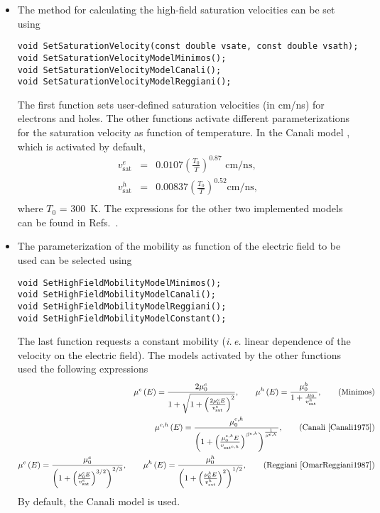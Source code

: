 \begin{itemize}
  \item
  The method for calculating the high-field saturation velocities 
  can be set using
\begin{lstlisting}
void SetSaturationVelocity(const double vsate, const double vsath);
void SetSaturationVelocityModelMinimos();
void SetSaturationVelocityModelCanali();
void SetSaturationVelocityModelReggiani();
\end{lstlisting}
  The first function sets user-defined saturation velocities (in cm/ns) for 
  electrons and holes. The other functions activate different parameterizations 
  for the saturation velocity as function of temperature. In the Canali model 
  \cite{Canali1975}, which is activated by default,
  \begin{eqnarray*}
    v_{\text{sat}}^{e} & = & 0.0107 \left(\frac{T_{0}}{T}\right)^{0.87} \text{ cm/ns}, \\ 
    v_{\text{sat}}^{h}  & = & 0.00837 \left(\frac{T_{0}}{T}\right)^{0.52} \text{cm/ns}, \\
  \end{eqnarray*}
  where \(T_{0}\) = 300~K. The expressions for the other two implemented 
  models can be found in Refs.~\cite{OmarReggiani1987,Quay2000}. 
  \item
  The parameterization of the mobility as function of the electric field 
  to be used can be selected using
\begin{lstlisting}
void SetHighFieldMobilityModelMinimos();
void SetHighFieldMobilityModelCanali();
void SetHighFieldMobilityModelReggiani();
void SetHighFieldMobilityModelConstant();
\end{lstlisting}
  The last function requests a constant mobility (\textit{i.\,e.} linear dependence of the 
  velocity on the electric field). 
  The models activated by the other functions used the following expressions
  \begin{eqnarray*}
    \mu^{e}\left(E\right) = \frac{2\mu_{0}^{e}}
                             {1 + \sqrt{1 + \left(\frac{2\mu_{0}^{e}E}{v_{\text{sat}}^{e}}\right)^{2}}}, \qquad 
    \mu^{h}\left(E\right) = \frac{\mu_{0}^{h}}{1 + \frac{\mu_{0}}{v_{\text{sat}}^{h}}}, \qquad
    \text{(Minimos)} \\
    \mu^{e,h}\left(E\right) = \frac{\mu_{0}^{e,h}}
                             {\left(1 + \left(\frac{\mu_{0}^{e,h}E}{v_{\text{sat}^{e,h}}}\right)^{\beta^{e,h}}\right)^{\frac{1}{\beta^{e,h}}}}, \qquad 
    \text{(Canali \cite{Canali1975})} \\ 
    \mu^{e}\left(E\right) = \frac{\mu_{0}^{e}}
                             {\left(1 + \left(\frac{\mu_{0}^{e}E}{v_{\text{sat}}^{e}}\right)^{3/2}\right)^{2/3}}, \qquad
    \mu^{h}\left(E\right) = \frac{\mu_{0}^{h}}
                             {\left(1 + \left(\frac{\mu_{0}^{h}E}{v_{\text{sat}}^{h}}\right)^{2}\right)^{1/2}}, \qquad
    \text{(Reggiani \cite{OmarReggiani1987})}
  \end{eqnarray*}
  By default, the Canali model is used.
\end{itemize}

